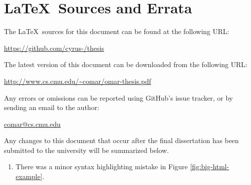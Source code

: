 \newpage
\section*{\LaTeX~Sources and Errata}
\noindent
The \LaTeX~sources for this document can be found at the following URL:
\begin{center}
\url{https://github.com/cyrus-/thesis}
\end{center}
The latest version of this document can be downloaded from the following URL:
\begin{center}
\url{http://www.cs.cmu.edu/~comar/omar-thesis.pdf}
\end{center}
Any errors or omissions can be reported using GitHub's issue tracker, or by sending an email to the author:
\begin{center}
\url{comar@cs.cmu.edu}
\end{center}
Any changes to this document that occur after the final dissertation  has been submitted to the university will be summarized below.

\begin{enumerate}
	\item There was a minor syntax highlighting mistake in Figure \ref{fig:big-html-example}.
\end{enumerate}